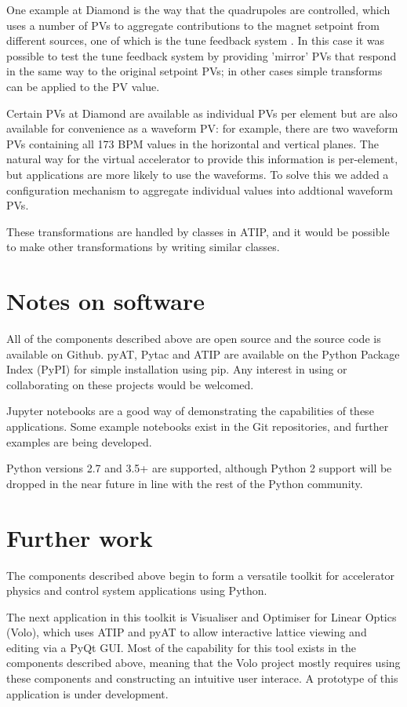 \documentclass[a4paper,
               keeplastbox,   %
               ]{jacow}
\begin{document}
One example at Diamond is the way that the quadrupoles are 
controlled, which uses a number of PVs to aggregate contributions to the magnet
setpoint from different sources, one of which is the tune feedback system \cite{feedbacks}.
In this case it was possible to test the tune feedback system by providing 'mirror'
PVs that respond in the same way to the original setpoint PVs; in other cases
simple transforms can be applied to the PV value.

Certain PVs at Diamond are available as individual PVs per element but are also
available for convenience as a waveform PV: for example, there are two waveform
PVs containing all 173 BPM values in the horizontal and vertical planes. The natural
way for the virtual accelerator to provide this information is per-element, but
applications are more likely to use the waveforms. To solve this we added a
configuration mechanism to aggregate individual values into addtional waveform PVs.

These transformations are handled by classes in ATIP, and it would be possible to
make other transformations by writing similar classes.

\section{Notes on software}

All of the components described above are open source and the source code is available
on Github. pyAT, Pytac and ATIP are available on the Python Package Index (PyPI) \cite{pypi} 
for simple installation using pip. Any interest in using or collaborating on these 
projects would be welcomed.

Jupyter notebooks are a good way of demonstrating the capabilities of these applications.
Some example notebooks exist in the Git repositories, and further examples are being developed.

Python versions 2.7 and 3.5+ are supported, although Python 2 support will be dropped
in the near future in line with the rest of the Python community.

\section{Further work}

The components described above begin to form a versatile toolkit for accelerator
physics and control system applications using Python. 

The next application in this toolkit is Visualiser and Optimiser for Linear Optics
(Volo), which uses ATIP and pyAT to allow interactive lattice viewing and editing
via a PyQt GUI. Most of the capability for this tool exists in the components
described above, meaning that the Volo project mostly requires using these components
and constructing an intuitive user interace. A prototype of this application is under
development.
\end{document}
